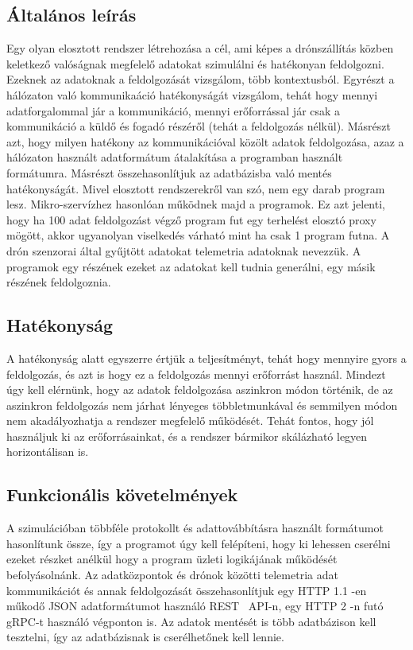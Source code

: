 

\subsection{Általános leírás}
Egy olyan elosztott rendszer létrehozása a cél, ami képes a drónszállítás közben keletkező valóságnak megfelelő adatokat szimulálni és hatékonyan feldolgozni.
Ezeknek az adatoknak a feldolgozását vizsgálom, több kontextusból.
Egyrészt a hálózaton való kommunikaáció hatékonyságát vizsgálom, tehát hogy mennyi adatforgalommal jár a kommunikáció, mennyi erőforrással jár csak a kommunikáció a küldő és fogadó részéről (tehát a feldolgozás nélkül).
Másrészt azt, hogy milyen hatékony az kommunikációval közölt adatok feldolgozása, azaz a hálózaton használt adatformátum átalakítása a programban használt formátumra. Másrészt összehasonlítjuk az adatbázisba való mentés hatékonyságát.
Mivel elosztott rendszerekről van szó, nem egy darab program lesz.
Mikro-szervízhez hasonlóan működnek majd a programok.
Ez azt jelenti, hogy ha 100 adat feldolgozást végző program fut egy terhelést elosztó proxy mögött, akkor ugyanolyan viselkedés várható mint ha csak 1 program futna.
A drón szenzorai által gyűjtött adatokat telemetria adatoknak nevezzük. A programok egy részének ezeket az adatokat kell tudnia generálni, egy másik részének feldolgoznia.

\subsection{Hatékonyság}
A hatékonyság alatt egyszerre értjük a teljesítményt, tehát hogy mennyire gyors a feldolgozás, és azt is hogy ez a feldolgozás mennyi erőforrást használ.
Mindezt úgy kell elérnünk, hogy az  adatok feldolgozása aszinkron módon történik, de az aszinkron feldolgozás nem járhat lényeges többletmunkával és semmilyen módon nem akadályozhatja a rendszer megfelelő működését.
Tehát fontos, hogy jól használjuk ki az erőforrásainkat, és a rendszer bármikor skálázható legyen horizontálisan is.


\subsection{Funkcionális követelmények}
A szimulációban többféle protokollt és adattovábbításra használt formátumot hasonlítunk össze, így a programot úgy kell felépíteni, hogy ki lehessen cserélni ezeket részket anélkül hogy a program üzleti logikájának működését befolyásolnánk.
Az adatközpontok és drónok közötti telemetria adat kommunikációt és annak feldolgozását összehasonlítjuk egy HTTP 1.1 -en műkodő JSON adatformátumot használó REST~\cite{Wikipedia-REST} API-n, egy HTTP 2 -n futó gRPC-t használó végponton is.
Az adatok mentését is több adatbázison kell tesztelni, így az adatbázisnak is cserélhetőnek kell lennie.

